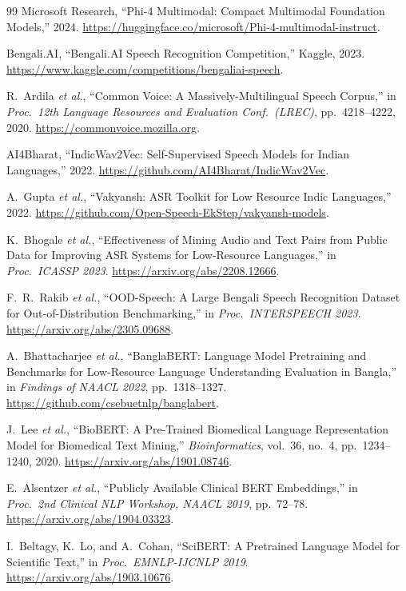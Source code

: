 \documentclass[12pt,a4paper]{article}
\begin{document}
\begin{thebibliography}{99}
Microsoft Research,
``Phi-4 Multimodal: Compact Multimodal Foundation Models,''
2024. \url{https://huggingface.co/microsoft/Phi-4-multimodal-instruct}.

Bengali.AI,
``Bengali.AI Speech Recognition Competition,''
Kaggle, 2023.
\url{https://www.kaggle.com/competitions/bengaliai-speech}.

R.~Ardila \emph{et al.},
``Common Voice: A Massively-Multilingual Speech Corpus,''
in \emph{Proc.\ 12th Language Resources and Evaluation Conf.\
(LREC)}, pp.~4218--4222, 2020.
\url{https://commonvoice.mozilla.org}.

AI4Bharat,
``IndicWav2Vec: Self-Supervised Speech Models for Indian Languages,''
2022. \url{https://github.com/AI4Bharat/IndicWav2Vec}.

A.~Gupta \emph{et al.},
``Vakyansh: ASR Toolkit for Low Resource Indic Languages,''
2022. \url{https://github.com/Open-Speech-EkStep/vakyansh-models}.

K.~Bhogale \emph{et al.},
``Effectiveness of Mining Audio and Text Pairs from Public Data for
Improving ASR Systems for Low-Resource Languages,''
in \emph{Proc.\ ICASSP 2023}.
\url{https://arxiv.org/abs/2208.12666}.

F.~R.~Rakib \emph{et al.},
``OOD-Speech: A Large Bengali Speech Recognition Dataset for
Out-of-Distribution Benchmarking,''
in \emph{Proc.\ INTERSPEECH 2023}.
\url{https://arxiv.org/abs/2305.09688}.

A.~Bhattacharjee \emph{et al.},
``BanglaBERT: Language Model Pretraining and Benchmarks for
Low-Resource Language Understanding Evaluation in Bangla,''
in \emph{Findings of NAACL 2022}, pp.~1318--1327.
\url{https://github.com/csebuetnlp/banglabert}.

J.~Lee \emph{et al.},
``BioBERT: A Pre-Trained Biomedical Language Representation Model
for Biomedical Text Mining,''
\emph{Bioinformatics}, vol.~36, no.~4, pp.~1234--1240, 2020.
\url{https://arxiv.org/abs/1901.08746}.

E.~Alsentzer \emph{et al.},
``Publicly Available Clinical BERT Embeddings,''
in \emph{Proc.\ 2nd Clinical NLP Workshop, NAACL 2019},
pp.~72--78.
\url{https://arxiv.org/abs/1904.03323}.

I.~Beltagy, K.~Lo, and A.~Cohan,
``SciBERT: A Pretrained Language Model for Scientific Text,''
in \emph{Proc.\ EMNLP-IJCNLP 2019}.
\url{https://arxiv.org/abs/1903.10676}.


\end{thebibliography}
\end{document}
